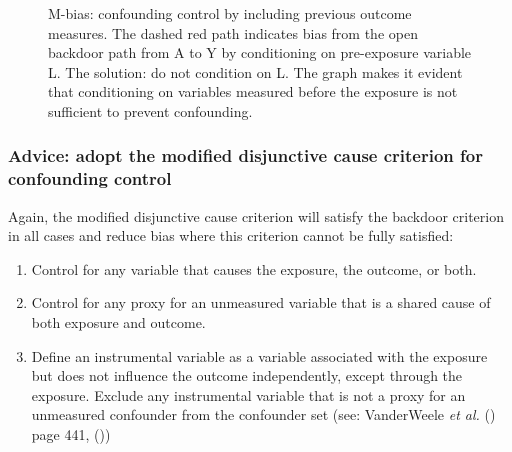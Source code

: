 \documentclass[
  singlecolumn,
  9pt]{article}
\providecommand{\tightlist}{%
  \setlength{\itemsep}{0pt}\setlength{\parskip}{0pt}}\usepackage{longtable,booktabs,array}
\begin{document}
\begin{figure}


\caption{\label{fig-m-bias}M-bias: confounding control by including
previous outcome measures. The dashed red path indicates bias from the
open backdoor path from A to Y by conditioning on pre-exposure variable
L. The solution: do not condition on L. The graph makes it evident that
conditioning on variables measured before the exposure is not sufficient
to prevent confounding.}

\end{figure}%

\subsubsection{Advice: adopt the modified disjunctive cause criterion
for confounding
control}\label{advice-adopt-the-modified-disjunctive-cause-criterion-for-confounding-control}

Again, the modified disjunctive cause criterion will satisfy the
backdoor criterion in all cases and reduce bias where this criterion
cannot be fully satisfied:

\begin{enumerate}
\def\labelenumi{\alph{enumi}.}
\tightlist
\item
  Control for any variable that causes the exposure, the outcome, or
  both.
\item
  Control for any proxy for an unmeasured variable that is a shared
  cause of both exposure and outcome.
\item
  Define an instrumental variable as a variable associated with the
  exposure but does not influence the outcome independently, except
  through the exposure. Exclude any instrumental variable that is not a
  proxy for an unmeasured confounder from the confounder set (see:
  VanderWeele \emph{et al.} () page
  441, ())
\end{enumerate}
\end{document}
